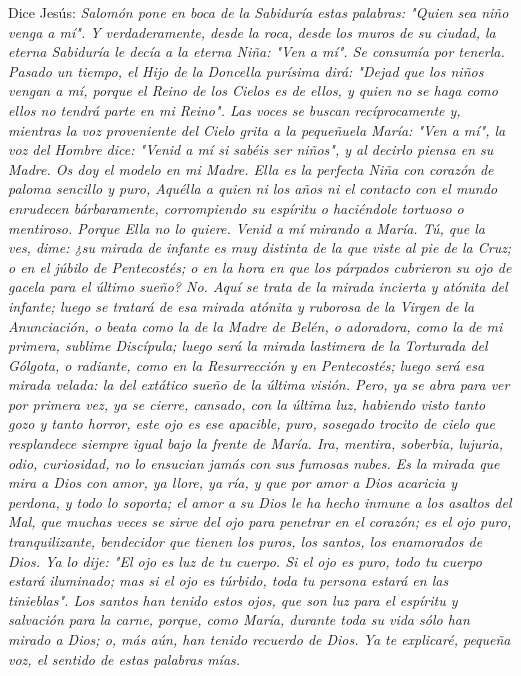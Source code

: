 \documentclass[12pt]{book} %
\begin{document}
Dice Jesús: 
\emph{Salomón pone en boca de la Sabiduría estas palabras: "Quien sea niño venga a mí". Y verdaderamente, desde la roca, desde los muros de su ciudad, la eterna Sabiduría le decía a la eterna Niña: "Ven a mí". Se consumía por tenerla. Pasado un tiempo, el Hijo de la Doncella purísima dirá: "Dejad que los niños vengan a mí, porque el Reino de los Cielos es de ellos, y quien no se haga como ellos no tendrá parte en mi Reino". Las voces se buscan recíprocamente y, mientras la voz proveniente del Cielo grita a la pequeñuela María: "Ven a mí", la voz del Hombre dice: "Venid a mí si sabéis ser niños", y al decirlo piensa en su Madre. Os doy el modelo en mi Madre. Ella es la perfecta Niña con corazón de paloma sencillo y puro, Aquélla a quien ni los años ni el contacto con el mundo enrudecen bárbaramente, corrompiendo su espíritu o haciéndole tortuoso o mentiroso. Porque Ella no lo quiere. Venid a mí mirando a María. Tú, que la ves, dime: ¿su mirada de infante es muy distinta de la que viste al pie de la Cruz; o en el júbilo de Pentecostés; o en la hora en que los párpados cubrieron su ojo de gacela para el último sueño? No. Aquí se trata de la mirada incierta y atónita del infante; luego se tratará de esa mirada atónita y ruborosa de la Virgen de la Anunciación, o beata como la de la Madre de Belén, o adoradora, como la de mi primera, sublime Discípula; luego será la mirada lastimera de la Torturada del Gólgota, o radiante, como en la Resurrección y en Pentecostés; luego será esa mirada velada: la del extático sueño de la última visión. Pero, ya se abra para ver por primera vez, ya se cierre, cansado, con la última luz, habiendo visto tanto gozo y tanto horror, este ojo es ese apacible, puro, sosegado trocito de cielo que resplandece siempre igual bajo la frente de María. Ira, mentira, soberbia, lujuria, odio, curiosidad, no lo ensucian jamás con sus fumosas nubes. Es la mirada que mira a Dios con amor, ya llore, ya ría, y que por amor a Dios acaricia y perdona, y todo lo soporta; el amor a su Dios le ha hecho inmune a los asaltos del Mal, que muchas veces se sirve del ojo para penetrar en el corazón; es el ojo puro, tranquilizante, bendecidor que tienen los puros, los santos, los enamorados de Dios. Ya lo dije: "El ojo es luz de tu cuerpo. Si el ojo es puro, todo tu cuerpo estará iluminado; mas si el ojo es túrbido, toda tu persona estará en las tinieblas". Los santos han tenido estos ojos, que son luz para el espíritu y salvación para la carne, porque, como María, durante toda su vida sólo han mirado a Dios; o, más aún, han tenido recuerdo de Dios. Ya te explicaré, pequeña voz, el sentido de estas palabras mías. }
 
\end{document}
